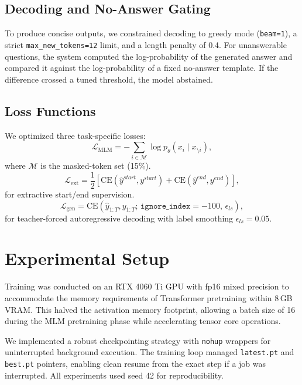 \documentclass[10pt,twocolumn]{article}
\begin{document}
\subsection{Decoding and No-Answer Gating}
To produce concise outputs, we constrained decoding to greedy mode (\texttt{beam=1}), a strict \texttt{max\_new\_tokens=12} limit, and a length penalty of 0.4. For unanswerable questions, the system computed the log-probability of the generated answer and compared it against the log-probability of a fixed no-answer template. If the difference crossed a tuned threshold, the model abstained.
\subsection{Loss Functions}
We optimized three task-specific losses:
\begin{equation}
\mathcal{L}_{\text{MLM}} = - \sum_{i \in \mathcal{M}} \log p_{\theta}(x_i \mid x_{\setminus i}),
\end{equation}
where $\mathcal{M}$ is the masked-token set (15\%).
\begin{equation}
\mathcal{L}_{\text{ext}} = \frac{1}{2}\left[\mathrm{CE}(\hat{y}^{start}, y^{start}) + \mathrm{CE}(\hat{y}^{end}, y^{end})\right],
\end{equation}
for extractive start/end supervision.
\begin{equation}
\mathcal{L}_{\text{gen}} = \mathrm{CE}(\hat{y}_{1:T}, y_{1:T};\, \texttt{ignore\_index}=-100,\, \epsilon_{ls}),
\end{equation}
for teacher-forced autoregressive decoding with label smoothing $\epsilon_{ls} = 0.05$.
\section{Experimental Setup}

Training was conducted on an RTX 4060 Ti GPU with fp16 mixed precision to accommodate the memory requirements of Transformer pretraining within 8\,GB VRAM. This halved the activation memory footprint, allowing a batch size of 16 during the MLM pretraining phase while accelerating tensor core operations.

We implemented a robust checkpointing strategy with \texttt{nohup} wrappers for uninterrupted background execution. The training loop managed \texttt{latest.pt} and \texttt{best.pt} pointers, enabling clean resume from the exact step if a job was interrupted. All experiments used seed 42 for reproducibility.
\end{document}
